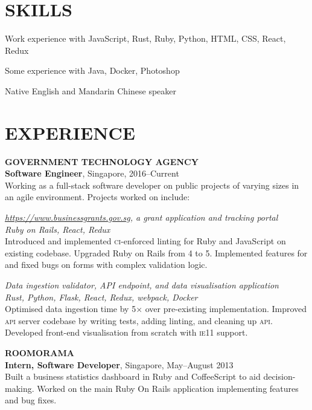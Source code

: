 \documentclass[line, margin]{res}
\makeatletter
\newcommand{\at}[0]{@}
\makeatother
\begin{document}
\address{
    \href{mailto:ng.guoyou+cv\at gmail.com}{ng.guoyou\at gmail.com}
    \href{https://github.com/gyng}{https://github.com/gyng}
}

\begin{resume}
    \section{SKILLS}
        Work experience with JavaScript, Rust, Ruby, Python, HTML, CSS, React, Redux

        Some experience with Java, Docker, Photoshop

        Native English and Mandarin Chinese speaker

    \section{EXPERIENCE}
        \textbf{GOVERNMENT TECHNOLOGY AGENCY} \\
        \textbf{Software Engineer}, Singapore, 2016--Current \\
        Working as a full-stack software developer on public projects of varying sizes in an agile environment. Projects worked on include:

        \textit{\href{https://www.businessgrants.gov.sg/}{https://www.businessgrants.gov.sg}, a grant application and tracking portal} \\
        \textit{Ruby on Rails, React, Redux} \\
        Introduced and implemented \textsc{ci}-enforced linting for Ruby and JavaScript on existing codebase.
        Upgraded Ruby on Rails from 4 to 5.
        Implemented features for and fixed bugs on forms with complex validation logic.

        \textit{Data ingestion validator, API endpoint, and data visualisation application} \\
        \textit{Rust, Python, Flask, React, Redux, webpack, Docker} \\
        Optimised data ingestion time by 5$\times$ over pre-existing implementation.
        Improved \textsc{api} server codebase by writing tests, adding linting, and cleaning up \textsc{api}.
        Developed front-end visualisation from scratch with \textsc{ie11} support.

        \textbf{ROOMORAMA} \\
        \textbf{Intern, Software Developer}, Singapore, May--August 2013 \\
        Built a business statistics dashboard in Ruby and CoffeeScript to aid decision-making. Worked on the main Ruby On Rails application implementing features and bug fixes.


\end{resume}
\end{document}
